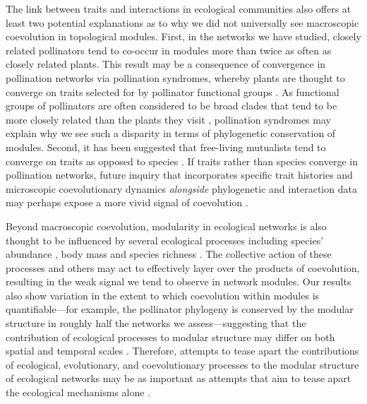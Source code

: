 \documentclass{article}
\begin{document}
	The link between traits and interactions in ecological communities \citep{Guimaraes2011, Dehling2014} also offers at least two potential explanations as to why we did not universally see macroscopic coevolution in topological modules. First, in the networks we have studied, closely related pollinators tend to co-occur in modules more than twice as often as closely related plants. This result may be a consequence of convergence in pollination networks via pollination syndromes, whereby plants are thought to converge on traits selected for by pollinator functional groups \citep{Fenster2004}. As functional groups of pollinators are often considered to be broad clades that tend to be more closely related than the plants they visit \citep{Fenster2004}, pollination syndromes may explain why we see such a disparity in terms of phylogenetic conservation of modules. Second, it has been suggested that free-living mutualists tend to converge on traits as opposed to species \citep{Thompson2005}. If traits rather than species converge in pollination networks, future inquiry that incorporates specific trait histories and microscopic coevolutionary dynamics \emph{alongside} phylogenetic and interaction data may perhaps expose a more vivid signal of coevolution \citep{Segraves2010}.
	
	Beyond macroscopic coevolution, modularity in ecological networks is also thought to be influenced by several ecological processes including species' abundance \citep{Krasnov2012}, body mass \citep{Rezende2009} and species richness \citep{Martin2015}. The collective action of these processes and others may act to effectively layer over the products of coevolution, resulting in the weak signal we tend to observe in network modules. Our results also show variation in the extent to which coevolution within modules is quantifiable---for example, the pollinator phylogeny is conserved by the modular structure in roughly half the networks we assess---suggesting that the contribution of ecological processes to modular structure may differ on both spatial and temporal scales \citep{Bascompte2014}. Therefore, attempts to tease apart the contributions of ecological, evolutionary, and coevolutionary processes to the modular structure of ecological networks may be as important as attempts that aim to tease apart the ecological mechanisms alone \citep{Vazquez2009, Kaiser2014}.
	
\end{document}
